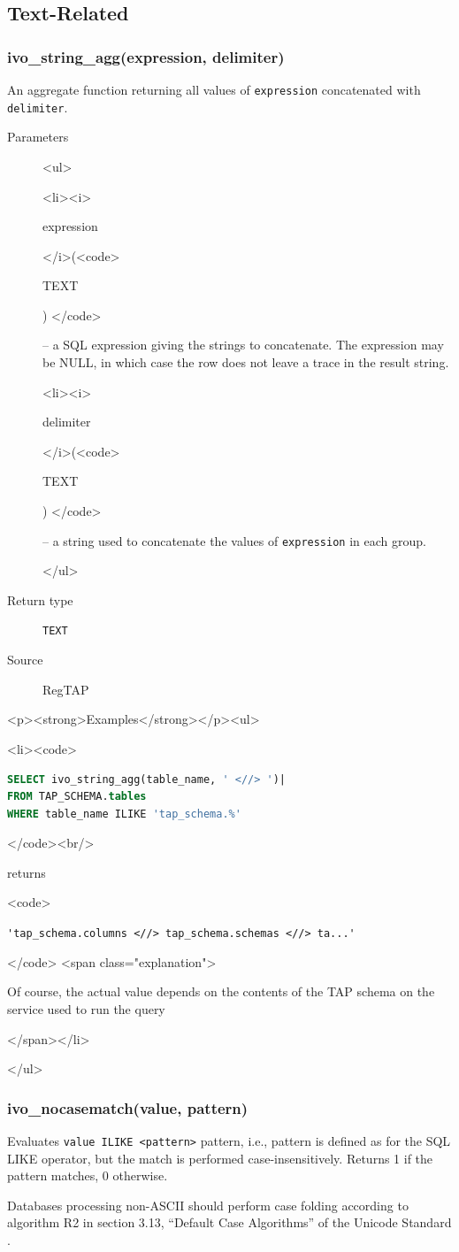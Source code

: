 \documentclass[11pt,a4paper]{ivoa}
\newenvironment{args}%
{\begin{html}<ul>\end{html}\def\arg##1(##2){\begin{html}<li><i>\end{html}%
  ##1 \begin{html}</i>(<code>\end{html}##2\begin{html}) </code>\end{html}}}%
{\begin{html}</ul>\end{html}}
\newenvironment{examples}%
{\begin{html}<p><strong>Examples</strong></p><ul>\end{html}%
  \def\example{\begin{html}<li><code>\end{html}}%
  \def\becomes{\begin{html}</code><br/>\end{html} returns
    \begin{html}<code>\end{html}}%
  \def\done##1.{\begin{html}</code> <span class="explanation">\end{html}
    ##1
    \begin{html}</span></li>\end{html}}}%
{\begin{html}</ul>\end{html}}
\begin{document}
\subsection{Text-Related}

\subsubsection{ivo\_string\_agg(expression, delimiter)}

An aggregate function returning all values of \texttt{expression} 
concatenated with \texttt{delimiter}.

\begin{description}
\item[Parameters]

\begin{args}
	\arg expression (TEXT) -- a SQL expression giving the strings to
	concatenate.  The expression may be NULL, in which case the row does
	not leave a trace in the result string.
	\arg delimiter (TEXT) -- a string used to concatenate the values of
	\texttt{expression} in each group.
\end{args}

\item[Return type] \texttt{TEXT}

\item[Source] RegTAP \citep{2014ivoa.spec.1208D}
\end{description}

\begin{examples}
\example \begin{lstlisting}[language=SQL]
SELECT ivo_string_agg(table_name, ' <//> ')|
FROM TAP_SCHEMA.tables
WHERE table_name ILIKE 'tap_schema.%'
\end{lstlisting}
\becomes \verb|'tap_schema.columns <//> tap_schema.schemas <//> ta...'|
\done Of course, the actual value depends on the contents of the TAP
schema on the service used to run the query.
\end{examples}

\subsubsection{ivo\_nocasematch(value, pattern)}

Evaluates \texttt{value ILIKE <pattern>} pattern, i.e.,
pattern is defined as for the SQL LIKE operator, but the match is
performed case-insensitively.  Returns
1 if the pattern matches, 0 otherwise.

Databases processing non-ASCII should perform case folding according to
algorithm R2 in section 3.13, ``Default Case Algorithms'' of the Unicode
Standard \citep{std:UNICODE}.
\end{document}
